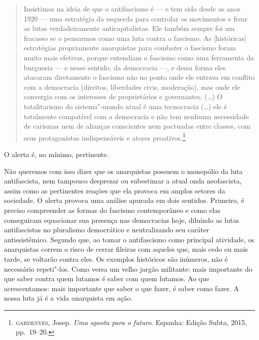 \begin{quote}
Insistimos na ideia de que o antifascismo é --- e tem sido desde os anos 1920 --- uma estratégia da esquerda para controlar os movimentos e frear as lutas verdadeiramente anticapitalistas. Ele também sempre foi um fracasso se o pensarmos como uma luta contra o fascismo. As [históricas] estratégias propriamente anarquistas para combater o fascismo foram muito mais efetivas, porque entendiam o fascismo como uma ferramenta da burguesia --- e nesse sentido, da democracia ---, e dessa forma eles atacaram diretamente o fascismo não no ponto onde ele entrava em conflito com a democracia (direitos, liberdades civis, moderação), mas onde ele convergia com os interesses de proprietários e governantes. (\ldots{}) O totalitarismo do sistema"-mundo atual é uma tecnocracia (\ldots{}) ele é totalmente compatível com a democracia e não tem nenhuma necessidade de carismas nem de alianças conscientes nem pactuadas entre classes, com seus protagonistas indispensáveis e atores proativos.\footnote{\textsc{gardenyes}, Josep. \emph{Uma aposta para o futuro}. Espanha: Edição Subta, 2015, pp.~19--20.}
\end{quote}

O alerta é, no mínimo, pertinente.

Não queremos com isso dizer que os anarquistas possuem o monopólio da luta antifascista, nem tampouco desprezar ou subestimar a atual onda neofascista, assim como as pertinentes reações que ela provoca em amplos setores da sociedade. O alerta provoca uma análise apurada em dois sentidos. Primeiro, é preciso compreender as formas do fascismo contemporâneo e como elas conseguiram equacionar sua presença nas democracias hoje, diluindo as lutas antifascistas no pluralismo democrático e neutralizando seu caráter antissistêmico. Segundo que, ao tomar o antifascismo como principal atividade, os anarquistas correm o risco de cerrar fileiras com aqueles que, mais cedo ou mais tarde, se voltarão contra eles. Os exemplos históricos são inúmeros, não é necessário repeti"-los. Como versa um velho jargão militante: mais importante do que saber contra quem lutamos é saber com quem lutamos. Ao que acrescentamos: mais importante que saber o que fazer, é saber como fazer. A nossa luta já é a vida anarquista em ação.

